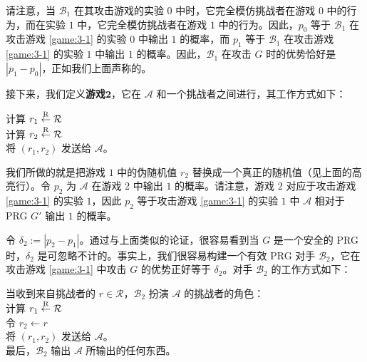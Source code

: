 \vspace*{5pt}

\noindent
请注意，当 $\mathcal B_1$ 在其攻击游戏的实验 $0$ 中时，它完全模仿挑战者在游戏 $0$ 中的行为，而在实验 $1$ 中，它完全模仿挑战者在游戏 $1$ 中的行为。因此，$p_0$ 等于 $\mathcal B_1$ 在攻击游戏 \ref{game:3-1} 的实验 $0$ 中输出 $1$ 的概率，而 $p_1$ 等于 $\mathcal B_1$ 在攻击游戏 \ref{game:3-1} 的实验 $1$ 中输出 $1$ 的概率。因此，$\mathcal B_1$ 在攻击 $G$ 时的优势恰好是 $|p_1-p_0|$，正如我们上面声称的。

接下来，我们定义\textbf{游戏$\mathbf{2}$}，它在 $\mathcal A$ 和一个挑战者之间进行，其工作方式如下：

\vspace*{5pt}

\hspace*{5pt} 计算 $r_1\overset{\rm R}\leftarrow\mathcal R$\\
\hspace*{23pt} \colorbox{gray!50}{计算 $r_2\overset{\rm R}\leftarrow\mathcal R$}\\
\hspace*{26pt} 将 $(r_1,r_2)$ 发送给 $\mathcal A$。

\vspace*{5pt}

\noindent
我们所做的就是把游戏 $1$ 中的伪随机值 $r_2$ 替换成一个真正的随机值（见上面的高亮行）。令 $p_2$ 为 $\mathcal A$ 在游戏 $2$ 中输出 $1$ 的概率。请注意，游戏 $2$ 对应于攻击游戏 \ref{game:3-1} 的实验 $1$，因此 $p_2$ 等于攻击游戏 \ref{game:3-1} 的实验 $1$ 中 $\mathcal A$ 相对于 PRG $G'$ 输出 $1$ 的概率。

令 $\delta_2:=|p_2-p_1|$。通过与上面类似的论证，很容易看到当 $G$ 是一个安全的 PRG 时，$\delta_2$ 是可忽略不计的。事实上，我们很容易构建一个有效 PRG 对手 $\mathcal B_2$，它在攻击游戏 \ref{game:3-1} 中攻击 $G$ 的优势正好等于 $\delta_2$。对手 $\mathcal B_2$ 的工作方式如下：

\vspace*{5pt}

\hspace*{5pt} 当收到来自挑战者的 $r\in\mathcal R$，$\mathcal B_2$ 扮演 $\mathcal A$ 的挑战者的角色：\\
\hspace*{50pt} 计算 $r_1\overset{\rm R}\leftarrow\mathcal R$\\
\hspace*{50pt} 令 $r_2\leftarrow r$\\
\hspace*{50pt} 将 $(r_1,r_2)$ 发送给 $\mathcal A$。\\
\hspace*{26pt} 最后，$\mathcal B_2$ 输出 $\mathcal A$ 所输出的任何东西。

